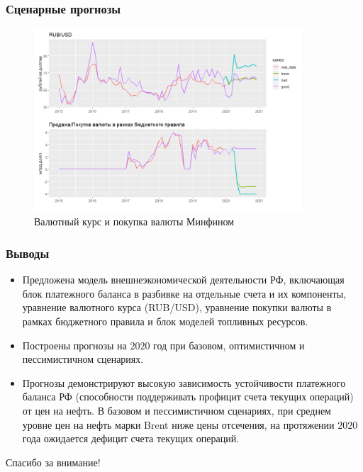 \documentclass[9pt]{beamer}
\begin{document}
\begin{frame}
	\frametitle{Сценарные прогнозы}
\begin{figure}[htp]
	\centering
	\includegraphics[width=10cm]{rub_2015.png}
	\caption{Валютный курс и покупка валюты Минфином}\label{fi:8}
\end{figure}
\end{frame}


\begin{frame}
		\frametitle{Выводы}
	\begin{itemize}
		\item Предложена модель внешнеэкономической деятельности РФ, включающая блок платежного баланса в разбивке на отдельные счета и их компоненты, уравнение валютного курса (RUB/USD), уравнение покупки валюты в рамках бюджетного правила и блок моделей топливных ресурсов.
		\item Построены прогнозы на $2020$ год при базовом, оптимистичном и пессимистичном сценариях.
		\item Прогнозы демонстрируют высокую зависимость устойчивости платежного баланса РФ (способности поддерживать профицит счета текущих операций) от цен на нефть. 
		В базовом и пессимистичном сценариях, при среднем
		уровне цен на нефть марки Brent ниже цены отсечения, на протяжении $2020$
		года ожидается дефицит счета текущих операций.
	\end{itemize}	
\end{frame}

\begin{frame}[c]
\begin{center}

{\LARGE Спасибо за внимание!}

\bigskip

{\insertauthor} 

\bigskip\bigskip


\bigskip\bigskip


\end{center}
\end{frame}
\end{document}
